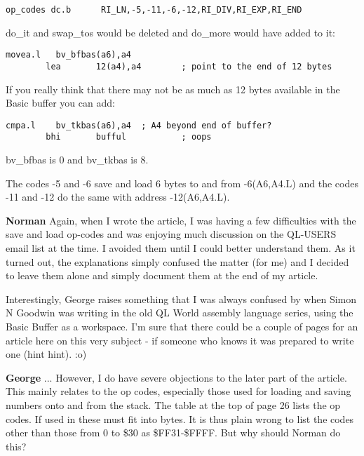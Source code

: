 \begin{lstlisting}[firstnumber=60,caption={ANYROOT - Swap\_Tos - Suggested Op Codes}]
op_codes dc.b      RI_LN,-5,-11,-6,-12,RI_DIV,RI_EXP,RI_END
\end{lstlisting}

do\_it and swap\_tos would be deleted and do\_more would have added to
    it:

\begin{lstlisting}[firstnumber=1,]
        movea.l   bv_bfbas(a6),a4
        lea       12(a4),a4        ; point to the end of 12 bytes
\end{lstlisting}

If you really think that there may not be as much as 12 bytes
    available in the Basic buffer you can add:

\begin{lstlisting}[firstnumber=1,]
        cmpa.l    bv_tkbas(a6),a4  ; A4 beyond end of buffer?
        bhi       bufful           ; oops
\end{lstlisting}

bv\_bfbas is 0 and bv\_tkbas is 8.

The codes -{}5 and -{}6 save and load 6 bytes to and from -{}6(A6,A4.L)
    and the codes -{}11 and -{}12 do the same with address -{}12(A6,A4.L).

{\bf Norman} 
Again, when I wrote the article,
    I was having a few difficulties with the save and load op-{}codes and was
    enjoying much discussion on the QL-{}USERS email list at the time. I avoided
    them until I could better understand them. As it turned out, the
    explanations simply confused the matter (for me) and I decided to leave
    them alone and simply document them at the end of my article.



Interestingly, George raises something that I was always confused by
    when Simon N Goodwin was writing in the old QL World assembly language
    series, using the Basic Buffer as a workspace. I'm sure that there could
    be a couple of pages for an article here on this very subject -{} if someone
    who knows it was prepared to write one (hint hint). :o)

{\bf George} 
... However, I do have severe
    objections to the later part of the article. This mainly relates to the op
    codes, especially those used for loading and saving numbers onto and from
    the stack. The table at the top of page 26 lists the op codes. If used in
     these must fit into bytes. It is thus plain wrong to list the
    codes other than those from 0 to \$30 as \$FF31-{}\$FFFF. But why should Norman
    do this?



